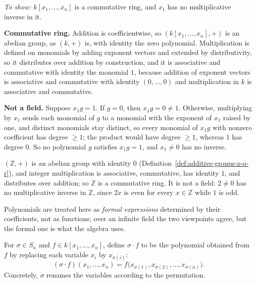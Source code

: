 \documentclass[11pt]{report}
\begin{document}
\begin{exbox}\label{ex:polynomial-ring-commutative-not-field}
\textit{To show:} $k[x_1, \ldots, x_n]$ is a commutative ring, and $x_1$ has no multiplicative inverse in it.

\textbf{Commutative ring.} Addition is coefficientwise, so $(k[x_1, \ldots, x_n], +)$ is an abelian group, as $(k, +)$ is, with identity the zero polynomial. Multiplication is defined on monomials by adding exponent vectors and extended by distributivity, so it distributes over addition by construction, and it is associative and commutative with identity the monomial $1$, because addition of exponent vectors is associative and commutative with identity $(0, \ldots, 0)$ and multiplication in $k$ is associative and commutative.

\textbf{Not a field.} Suppose $x_1 g = 1$. If $g = 0$, then $x_1 g = 0 \neq 1$. Otherwise, multiplying by $x_1$ sends each monomial of $g$ to a monomial with the exponent of $x_1$ raised by one, and distinct monomials stay distinct, so every monomial of $x_1 g$ with nonzero coefficient has degree $\geq 1$; the product would have degree $\geq 1$, whereas $1$ has degree $0$. So no polynomial $g$ satisfies $x_1 g = 1$, and $x_1 \neq 0$ has no inverse.
\end{exbox}

\begin{exbox}\label{ex:integers-commutative-ring-not-field}
$(\mathbb{Z}, +)$ is an abelian group with identity $0$ (Definition~\ref{def:additive-groups-z-q-r}), and integer multiplication is associative, commutative, has identity $1$, and distributes over addition; so $\mathbb{Z}$ is a commutative ring. It is not a field: $2 \neq 0$ has no multiplicative inverse in $\mathbb{Z}$, since $2x$ is even for every $x \in \mathbb{Z}$ while $1$ is odd.
\end{exbox}

\begin{rembox}\label{rem:polynomials-formal-expressions}
Polynomials are treated here as \emph{formal expressions} determined by their coefficients, not as functions; over an infinite field the two viewpoints agree, but the formal one is what the algebra uses.
\end{rembox}

\begin{defbox}\label{def:action-sn-k-x1-xn}
For $\sigma \in S_n$ and $f \in k[x_1, \ldots, x_n]$, define $\sigma \cdot f$ to be the polynomial obtained from $f$ by replacing each variable $x_i$ by $x_{\sigma(i)}$:
\[ (\sigma \cdot f)(x_1, \ldots, x_n) = f\big(x_{\sigma(1)}, x_{\sigma(2)}, \ldots, x_{\sigma(n)}\big). \]
Concretely, $\sigma$ renames the variables according to the permutation.
\end{defbox}
\end{document}
